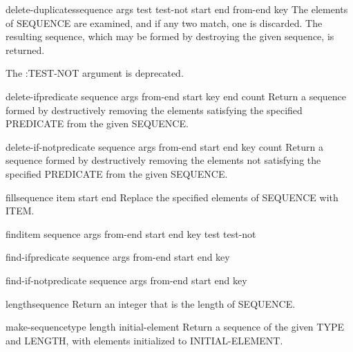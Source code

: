 \begin{function}{delete-duplicates}{sequence \rest args \key test test-not start end from-end key}
  The elements of SEQUENCE are examined, and if any two match, one is
   discarded. The resulting sequence, which may be formed by destroying the
   given sequence, is returned.

   The :TEST-NOT argument is deprecated.
\end{function}

\begin{function}{delete-if}{predicate sequence \rest args \key from-end start key end count}
  Return a sequence formed by destructively removing the elements satisfying
  the specified PREDICATE from the given SEQUENCE.
\end{function}

\begin{function}{delete-if-not}{predicate sequence \rest args \key from-end start end key count}
  Return a sequence formed by destructively removing the elements not
  satisfying the specified PREDICATE from the given SEQUENCE.
\end{function}

\begin{function}{fill}{sequence item \key start end}
  Replace the specified elements of SEQUENCE with ITEM.
\end{function}

\begin{function}{find}{item sequence \rest args \key from-end start end key test test-not}
  
\end{function}

\begin{function}{find-if}{predicate sequence \rest args \key from-end start end key}
  
\end{function}

\begin{function}{find-if-not}{predicate sequence \rest args \key from-end start end key}
  
\end{function}

\begin{function}{length}{sequence}
  Return an integer that is the length of SEQUENCE.
\end{function}

\begin{function}{make-sequence}{type length \key initial-element}
  Return a sequence of the given TYPE and LENGTH, with elements initialized
  to INITIAL-ELEMENT.
\end{function}

